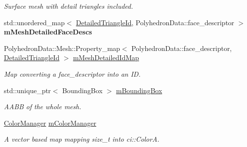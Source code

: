 \begin{DoxyCompactItemize}
\begin{DoxyCompactList}\small\item\em Surface mesh with detail triangles included. \end{DoxyCompactList}\item 
\mbox{\label{classpepr3d_1_1_geometry_a111ad109dfecf9e9d3371291d1271ac9}} 
std\+::unordered\+\_\+map$<$ \mbox{\hyperlink{structpepr3d_1_1_detailed_triangle_id}{Detailed\+Triangle\+Id}}, Polyhedron\+Data\+::face\+\_\+descriptor $>$ {\bfseries m\+Mesh\+Detailed\+Face\+Descs}
\item 
\mbox{\label{classpepr3d_1_1_geometry_adf2777044b00de455536e8bc0efc3b07}} 
Polyhedron\+Data\+::\+Mesh\+::\+Property\+\_\+map$<$ Polyhedron\+Data\+::face\+\_\+descriptor, \mbox{\hyperlink{structpepr3d_1_1_detailed_triangle_id}{Detailed\+Triangle\+Id}} $>$ \mbox{\hyperlink{classpepr3d_1_1_geometry_adf2777044b00de455536e8bc0efc3b07}{m\+Mesh\+Detailed\+Id\+Map}}
\begin{DoxyCompactList}\small\item\em Map converting a face\+\_\+descriptor into an ID. \end{DoxyCompactList}\item 
\mbox{\label{classpepr3d_1_1_geometry_af247be6afb090aa4edecb32786103ae1}} 
std\+::unique\+\_\+ptr$<$ Bounding\+Box $>$ \mbox{\hyperlink{classpepr3d_1_1_geometry_af247be6afb090aa4edecb32786103ae1}{m\+Bounding\+Box}}
\begin{DoxyCompactList}\small\item\em A\+A\+BB of the whole mesh. \end{DoxyCompactList}\item 
\mbox{\label{classpepr3d_1_1_geometry_a435bf3487105e8fb7867614845d69885}} 
\mbox{\hyperlink{classpepr3d_1_1_color_manager}{Color\+Manager}} \mbox{\hyperlink{classpepr3d_1_1_geometry_a435bf3487105e8fb7867614845d69885}{m\+Color\+Manager}}
\begin{DoxyCompactList}\small\item\em A vector based map mapping size\+\_\+t into ci\+::\+ColorA. \end{DoxyCompactList}\item 
\mbox{\label{classpepr3d_1_1_geometry_a47baed18f665dbbe1c69b9b400ace85c}} 

\end{DoxyCompactItemize}
